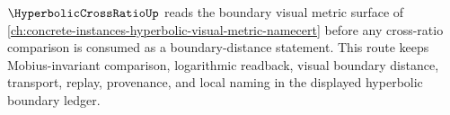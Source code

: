 $\HyperbolicCrossRatioUp$ reads the boundary visual metric surface of \autoref{ch:concrete-instances-hyperbolic-visual-metric-namecert} before any cross-ratio comparison is consumed as a boundary-distance statement. This route keeps Mobius-invariant comparison, logarithmic readback, visual boundary distance, transport, replay, provenance, and local naming in the displayed hyperbolic boundary ledger.

